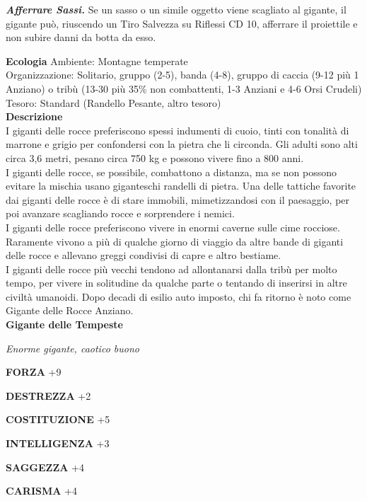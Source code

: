 \begin{multicols}{2}
\emph{\textbf{Afferrare Sassi.}} Se un sasso o un simile oggetto viene scagliato al gigante, il gigante può, riuscendo un Tiro Salvezza su Riflessi CD 10, afferrare il proiettile e non subire danni da botta da esso.

\textbf{Ecologia}
Ambiente: Montagne temperate\\
Organizzazione: Solitario, gruppo (2-5), banda (4-8), gruppo di caccia (9-12 più 1 Anziano) o tribù (13-30 più 35\% non combattenti, 1-3 Anziani e 4-6 Orsi Crudeli)\\
Tesoro: Standard (Randello Pesante, altro tesoro)\\
\textbf{Descrizione}\\
I giganti delle rocce preferiscono spessi indumenti di cuoio, tinti con tonalità di marrone e grigio per confondersi con la pietra che li circonda. Gli adulti sono alti circa 3,6 metri, pesano circa 750 kg e possono vivere fino a 800 anni.\\
I giganti delle rocce, se possibile, combattono a distanza, ma se non possono evitare la mischia usano giganteschi randelli di pietra. Una delle tattiche favorite dai giganti delle rocce è di stare immobili, mimetizzandosi con il paesaggio, per poi avanzare scagliando rocce e sorprendere i nemici.\\

I giganti delle rocce preferiscono vivere in enormi caverne sulle cime rocciose. Raramente vivono a più di qualche giorno di viaggio da altre bande di giganti delle rocce e allevano greggi condivisi di capre e altro bestiame.\\

I giganti delle rocce più vecchi tendono ad allontanarsi dalla tribù per molto tempo, per vivere in solitudine da qualche parte o tentando di inserirsi in altre civiltà umanoidi. Dopo decadi di esilio auto imposto, chi fa ritorno è noto come Gigante delle Rocce Anziano.\\


\medskip{}\textbf{Gigante delle Tempeste}

\emph{Enorme gigante, caotico buono}

\textbf{FORZA} +9

\textbf{DESTREZZA} +2

\textbf{COSTITUZIONE} +5

\textbf{INTELLIGENZA} +3

\textbf{SAGGEZZA} +4

\textbf{CARISMA} +4


\end{multicols}

